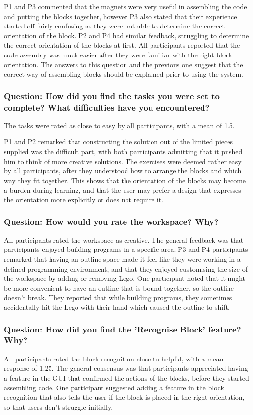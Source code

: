 \documentclass[oneside,%
                    author={Malak Hajji},
                    degree={BSc},
                    title={Designing An Accessible Computational Toolkit For Students},
                  subtitle={With Mixed Visual Abilities}]{dissertation}
\begin{document}
P1 and P3 commented that the magnets were very useful in assembling the code and putting the blocks together, however P3 also stated that their experience started off fairly confusing as they were not able to determine the correct orientation of the block. P2 and P4 had similar feedback, struggling to determine the correct orientation of the blocks at first.  All participants reported that the code assembly was much easier after they were familiar with the right block orientation. The answers to this question and the previous one suggest that the correct way of assembling blocks should be explained prior to using the system.

\subsubsection{Question: How did you find the tasks you were set to complete? What difficulties have you encountered?}
The tasks were rated as close to easy by all participants, with a mean of 1.5. 

P1 and P2 remarked that constructing the solution out of the limited pieces supplied was the difficult part, with both participants admitting that it pushed him to think of more creative solutions. The exercises were deemed rather easy by all participants, after they understood how to arrange the blocks and which way they fit together. This shows that the orientation of the blocks may become a burden during learning, and that the user may prefer a design that expresses the orientation more explicitly or does not require it. 


\subsubsection{Question: How would you rate the workspace? Why?}
All participants rated the workspace as creative. The general feedback was that participants enjoyed building programs in a specific area. P3 and P4 participants remarked that having an outline space made it feel like they were working in a defined programming environment, and that they enjoyed customising the size of the workspace by adding or removing Lego. One participant noted that it might be more convenient to have an outline that is bound together, so the outline doesn't break. They reported that while building programs, they sometimes accidentally hit the Lego with their hand which caused the outline to shift. 

\subsubsection{Question: How did you find the 'Recognise Block' feature? Why?}
All participants rated the block recognition close to helpful, with a mean response of 1.25. The general consensus was that participants appreciated having a feature in the GUI that confirmed the actions of the blocks, before they started assembling code. One participant suggested adding a feature in the block recognition that also tells the user if the block is placed in the right orientation, so that users don't struggle initially.
\end{document}
